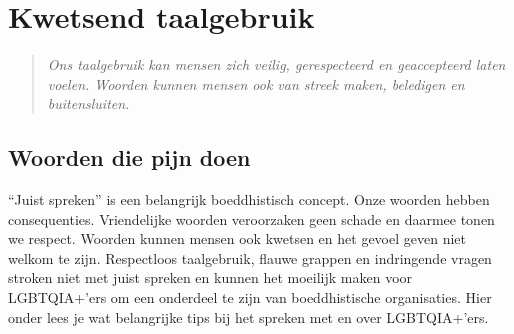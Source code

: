 \documentclass[12pt,openany]{book}
\begin{document}
\chapter*{Kwetsend taalgebruik}

\begin{quote}
\textit{Ons taalgebruik kan mensen zich veilig, gerespecteerd en geaccepteerd laten voelen. Woorden kunnen mensen ook van streek maken, beledigen en buitensluiten.}
\end{quote}

\begin{figure}[h]
    \centering
\end{figure}

\section*{Woorden die pijn doen}

“Juist spreken” is een belangrijk boeddhistisch concept. Onze woorden hebben consequenties. Vriendelijke woorden veroorzaken geen schade en daarmee tonen we respect. Woorden kunnen mensen ook kwetsen en het gevoel geven niet welkom te zijn. Respectloos taalgebruik, flauwe grappen en indringende vragen stroken niet met juist spreken en kunnen het moeilijk maken voor LGBTQIA+’ers om een onderdeel te zijn van boeddhistische organisaties.
	Hier onder lees je wat belangrijke tips bij het spreken met en over LGBTQIA+’ers. %
\end{document}
